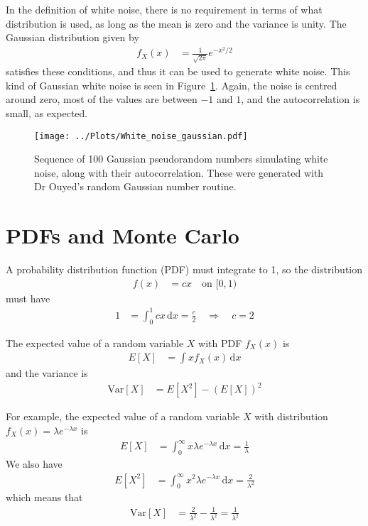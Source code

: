 \documentclass[twocolumn]{myarticle}
\renewcommand{\d}{\mathrm{d}}
\begin{document}
In the definition of white noise, there is no requirement in terms of what distribution is used, as long as the mean is zero and the variance is unity.
The Gaussian distribution given by
\begin{align}
    f_X(x) &= \frac{1}{\sqrt{2\pi}} e^{-x^2/2}
\end{align}
satisfies these conditions, and thus it can be used to generate white noise.
This kind of Gaussian white noise is seen in Figure~\ref{fig:white_noise_gaussian}.
Again, the noise is centred around zero, most of the values are between $ -1 $ and $ 1 $, and the autocorrelation is small, as expected.

\begin{figure}[ht!]
    \begin{center}
    \texttt{[image: ../Plots/White\_noise\_gaussian.pdf]}
    \caption{%
        Sequence of 100 Gaussian pseudorandom numbers simulating white noise, along with their autocorrelation.
        These were generated with Dr Ouyed's random Gaussian number routine.
    }
    \label{fig:white_noise_gaussian}
    \end{center}
\end{figure}

\section{PDFs and Monte Carlo}
\label{sec:pdfs_and_monte_carlo}

A probability distribution function (PDF) must integrate to 1, so the distribution
\begin{align}
    f(x) &= cx \quad \text{on } [0, 1)
\end{align}
must have
\begin{align}
    1 &= \int_{0}^{1} cx \, \d x = \frac{c}{2} \quad \Longrightarrow \quad c = 2
\end{align}

The expected value of a random variable $ X $ with PDF $ f_X(x) $ is
\begin{align}
    E[X] &= \int x f_X(x) \, \d x
\end{align}
and the variance is
\begin{align}
    \text{Var}[X] &= E[X^2] - (E[X])^2
\end{align}

For example, the expected value of a random variable $ X $ with distribution $ f_X(x) = \lambda e^{-\lambda x} $ is
\begin{align}
    E[X] &= \int_{0}^{\infty} x \lambda e^{-\lambda x} \, \d x = \frac{1}{\lambda}
\end{align}
We also have
\begin{align}
    E[X^2] &= \int_{0}^{\infty} x^2 \lambda e^{-\lambda x} \, \d x = \frac{2}{\lambda^2}
\end{align}
which means that
\begin{align}
    \text{Var}[X] &= \frac{2}{\lambda^2} - \frac{1}{\lambda^2} = \frac{1}{\lambda^2}
\end{align}
\end{document}
